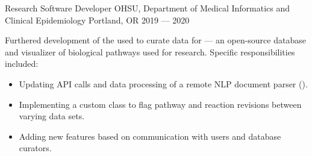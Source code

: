 \showoff
{Research Software Developer}
{OHSU, Department of Medical Informatics and Clinical Epidemiology}
{Portland, OR}
{2019 --- 2020}

Furthered development of the  used to curate data for  --- an open-source database and visualizer of biological pathways used for research. Specific responsibilities included:

\begin{itemize}[label=$\triangleright$]
    \item Updating API calls and data processing of a remote NLP document parser ().
    \item Implementing a custom class to flag pathway and reaction revisions between varying data sets.
    \item Adding new features based on communication with users and database curators.
\end{itemize}

